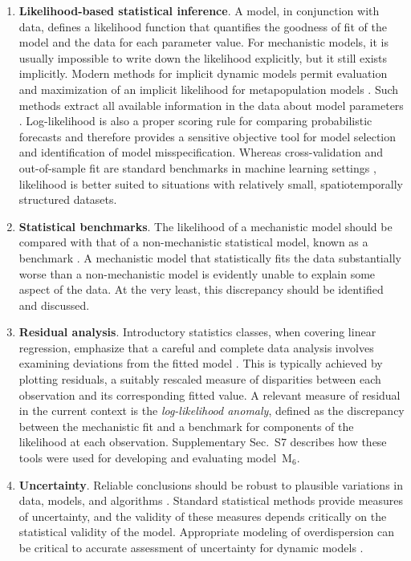 \documentclass[12pt]{article}\usepackage[]{graphicx}\usepackage[]{xcolor}
\newcommand\RevisedModelConstrained{M$_6$}
\newcommand\suppSecResiduals{S7} %
\begin{document}
\begin{enumerate}

\item \label{point:i} {\bf Likelihood-based statistical inference}. A model, in conjunction with data, defines a likelihood function that quantifies the goodness of fit of the model and the data for each parameter value.
For mechanistic models, it is usually impossible to write down the likelihood explicitly, but it still exists implicitly.
Modern methods for implicit dynamic models permit evaluation and maximization of an implicit likelihood for metapopulation models \citep{ning23,ionides22,whitehouse23}.
Such methods extract all available information in the data about model parameters \cite{pawitan01}.
Log-likelihood is also a proper scoring rule for comparing probabilistic forecasts \cite{gneiting07} and therefore provides a sensitive objective tool for model selection and identification of model misspecification.
Whereas cross-validation and out-of-sample fit are standard benchmarks in machine learning settings \cite{yu20}, likelihood is better suited to situations with relatively small, spatiotemporally structured datasets.

\item \label{point:ii} {\bf Statistical benchmarks}.
The likelihood of a mechanistic model should be compared with that of a non-mechanistic statistical model, known as a benchmark \cite{he10}. 
A mechanistic model that statistically fits the data substantially worse than a non-mechanistic model is evidently unable to explain some aspect of the data.
At the very least, this discrepancy should be identified and discussed.

\item \label{point:iii} {\bf Residual analysis}.
Introductory statistics classes, when covering linear regression, emphasize that a careful and complete data analysis involves examining deviations from the fitted model \cite{faraway14}.
This is typically achieved by plotting residuals, a suitably rescaled measure of disparities between each observation and its corresponding fitted value.
A relevant measure of residual in the current context is the {\it log-likelihood anomaly}, defined as the discrepancy between the mechanistic fit and a benchmark for components of the likelihood at each observation.
Supplementary Sec.~{\suppSecResiduals} describes how these tools were used for developing and evaluating model~{\RevisedModelConstrained}.

\item \label{point:vii} {\bf Uncertainty}.
Reliable conclusions should be robust to plausible variations in data, models, and algorithms \cite{yu20}.
Standard statistical methods provide measures of uncertainty, and the validity of these measures depends critically on the statistical validity of the model.
Appropriate modeling of overdispersion can be critical to accurate assessment of uncertainty for dynamic models \citep{breto09,he10,stocks20,whitehouse23}.


\end{enumerate}
\end{document}
